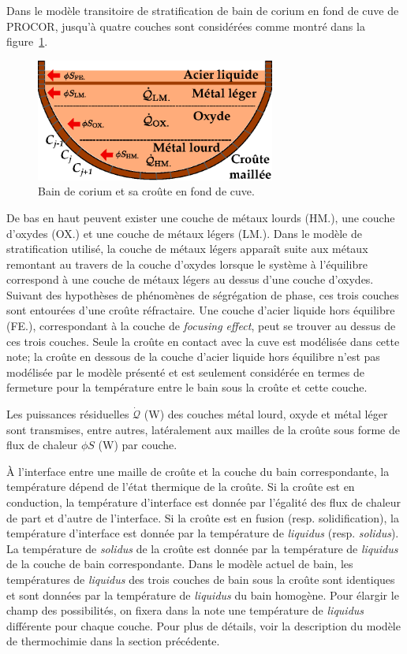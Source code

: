 Dans le modèle transitoire de stratification de bain de corium en fond de cuve de PROCOR, jusqu'à quatre couches sont considérées comme montré dans la figure~\ref{fig:bain_corium_croute}. 
\begin{figure}
\centering
\includegraphics[width=0.7\textwidth, keepaspectratio=true]{Figures/bain_corium_croute.eps}
\caption{Bain de corium et sa croûte en fond de cuve.}
\label{fig:bain_corium_croute}
\end{figure}
De bas en haut peuvent exister une couche de métaux lourds (HM.), une couche d'oxydes (OX.) et une couche de métaux légers (LM.). Dans le modèle de stratification utilisé, la couche de métaux légers apparaît suite aux métaux remontant au travers de la couche d'oxydes lorsque le système à l'équilibre correspond à une couche de métaux légers au dessus d'une couche d'oxydes. Suivant des hypothèses de phénomènes de ségrégation de phase, ces trois couches sont entourées d'une croûte réfractaire. Une couche d'acier liquide hors équilibre (FE.), correspondant à la couche de \textit{focusing effect}, peut se trouver au dessus de ces trois couches. Seule la croûte en contact avec la cuve est modélisée dans cette note; la croûte en dessous de la couche d'acier liquide hors équilibre n'est pas modélisée par le modèle présenté et est seulement considérée en termes de fermeture pour la température entre le bain sous la croûte et cette couche. 

Les puissances résiduelles $\dot{\mathcal{Q}}$ (W) des couches métal lourd, oxyde et métal léger sont transmises, entre autres, latéralement aux mailles de la croûte sous forme de flux de chaleur $\phi S$ (W) par couche.

À l'interface entre une maille de croûte et la couche du bain correspondante, la température dépend de l'état thermique de la croûte. Si la croûte est en conduction, la température d'interface est donnée par l'égalité des flux de chaleur de part et d'autre de l'interface. Si la croûte est en fusion (resp. solidification), la température d'interface est donnée par la température de \textit{liquidus} (resp. \textit{solidus}). La température de \textit{solidus} de la croûte est donnée par la température de \textit{liquidus} de la couche de bain correspondante. Dans le modèle actuel de bain, les températures de \textit{liquidus} des trois couches de bain sous la croûte sont identiques et sont données par la température de \textit{liquidus} du bain homogène. Pour élargir le champ des possibilités, on fixera dans la note une température de \textit{liquidus} différente pour chaque couche. Pour plus de détails, voir la description du modèle de thermochimie dans la section précédente. 

